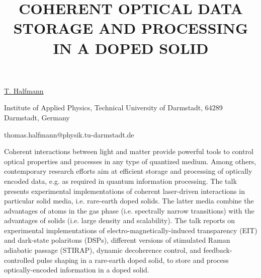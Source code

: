 \title{COHERENT OPTICAL DATA STORAGE AND PROCESSING IN A DOPED SOLID}

\underline{T. Halfmann} 

{\normalsize{\vspace{-4mm}
Institute of Applied Physics, Technical University of Darmstadt,
64289 Darmstadt, Germany

\email thomas.halfmann@physik.tu-darmstadt.de}}

Coherent interactions between light and matter provide powerful tools to control optical properties and processes in any type of quantized medium. Among others, contemporary research efforts aim at efficient storage and processing of optically encoded data, e.g. as required in quantum information processing. The talk presents experimental implementations of coherent laser-driven interactions in particular solid media, i.e. rare-earth doped solids. The latter media combine the advantages of atoms in the gas phase (i.e. spectrally narrow transitions) with the advantages of solids (i.e. large density and scalability). The talk reports on experimental implementations of electro-magnetically-induced transparency (EIT) and dark-state polaritons (DSPs), different versions of stimulated Raman adiabatic passage (STIRAP), dynamic decoherence control, and feedback-controlled pulse shaping in a rare-earth doped solid, to store and process optically-encoded information in a doped solid.

\vspace{\baselineskip} 
